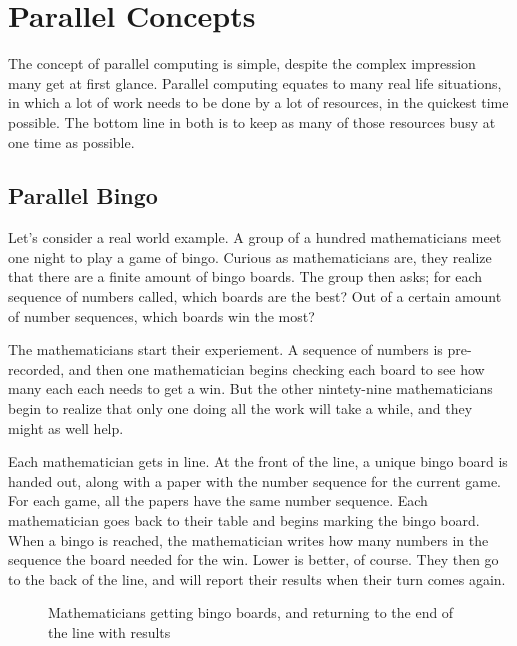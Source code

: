 \section{Parallel Concepts}
\label{sec:par_con}
The concept of parallel computing is simple, despite the complex impression many get at first glance.
Parallel computing equates to many real life situations, in which a lot of work needs to be done by a lot of 
resources, in the quickest time possible. The bottom line in both is to keep as many of those resources busy
at one time as possible.

\subsection{Parallel Bingo}
\label{sec:bingo}
Let's consider a real world example. A group of a hundred mathematicians meet one night to play a game of 
bingo. Curious as mathematicians are, they realize that there are a finite amount of bingo boards. The group
then asks; for each sequence of numbers called, which boards are the best? Out of a certain amount of 
number sequences, which boards win the most?

The mathematicians start their experiement. A sequence of numbers is pre-recorded, and then one 
mathematician begins checking each board to see how many each each needs to get a win. But the other 
nintety-nine mathematicians begin to realize that only one doing all the work will take a while, and they might
as well help.

Each mathematician gets in line. At the front of the line, a unique bingo board is handed out, along with a 
paper with the number sequence for the current game. For each game, all the papers have the same number 
sequence. Each mathematician goes back to their table and begins marking the bingo board. When a bingo is
reached, the mathematician writes how many numbers in the sequence the board needed for the win. Lower is
better, of course. They then go to the back of the line, and will report their results when their turn comes again.

\begin{figure}[h]
	\begin{center}
		\caption{Mathematicians getting bingo boards, and returning to the end of the line with results} 
		\label{bingo}
	\end{center}
\end{figure}

